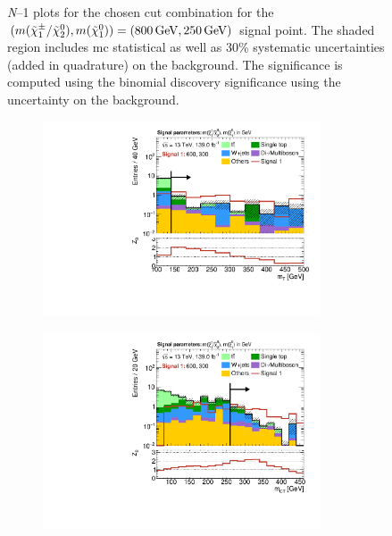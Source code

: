 \begin{figure}
	\caption[\textit{N}--1 plots for the chosen cut combination for the (800, 250) signal point]{\textit{N}--1 plots for the chosen cut combination for the $(m(\charg/\neutr), m(\lsp)) = (\SI{800}{\GeV}, \SI{250}{\GeV})$ signal point. The shaded region includes \gls{mc} statistical as well as 30\% systematic uncertainties (added in quadrature) on the background. The significance is computed using the binomial discovery significance using the uncertainty on the background.}
	\label{fig:results_n1_800_250}
\end{figure}

\begin{figure}
	\centering
	\begin{subfigure}[b]{0.5\linewidth}
		\centering\includegraphics[width=0.9\textwidth]{N-1_cut_scan/n1_600_300/mt}
	\end{subfigure}\hfill
	\begin{subfigure}[b]{0.5\linewidth}
		\centering\includegraphics[width=0.9\textwidth]{N-1_cut_scan/n1_600_300/mct}

\end{subfigure}
\end{figure}
